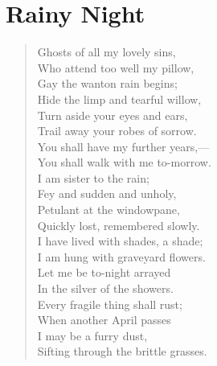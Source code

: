 \chapter{Rainy Night}
\begin{verse}
Ghosts of all my lovely sins,\\\empty{}
\hspace{1em}Who attend too well my pillow,\\\empty{}
Gay the wanton rain begins;\\\empty{}
\hspace{1em}Hide the limp and tearful willow,\\\empty{}
\vspace{0.75em}
Turn aside your eyes and ears,\\\empty{}
\hspace{1em}Trail away your robes of sorrow.\\\empty{}
You shall have my further years,—\\\empty{}
\hspace{1em}You shall walk with me to-morrow.\\\empty{}
\vspace{0.75em}
I am sister to the rain;\\\empty{}
\hspace{1em}Fey and sudden and unholy,\\\empty{}
Petulant at the windowpane,\\\empty{}
\hspace{1em}Quickly lost, remembered slowly.\\\empty{}
\vspace{0.75em}
I have lived with shades, a shade;\\\empty{}
\hspace{1em}I am hung with graveyard flowers.\\\empty{}
Let me be to-night arrayed\\\empty{}
\hspace{1em}In the silver of the showers.\\\empty{}
\vspace{0.75em}
Every fragile thing shall rust;\\\empty{}
\hspace{1em}When another April passes\\\empty{}
I may be a furry dust,\\\empty{}
\hspace{1em}Sifting through the brittle grasses.\\\empty{}

\end{verse}
